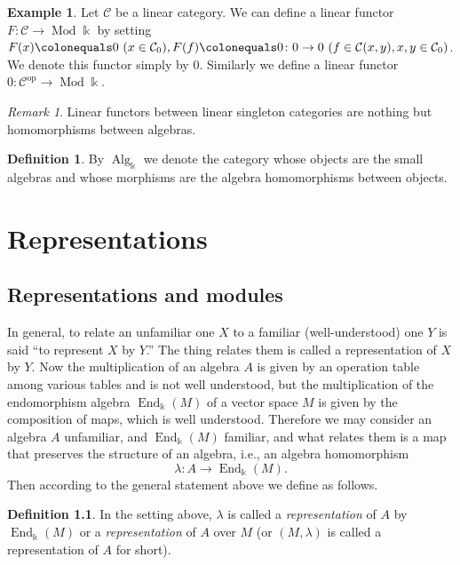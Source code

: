 \documentclass{surv-l}
\numberwithin{equation}{chapter}
\numberwithin{figure}{chapter}
\theoremstyle{plain}
\theoremstyle{definition}
\newtheorem{dfn}[thm]{Definition}
\newtheorem{exm}[thm]{Example}
\theoremstyle{remark}
\newtheorem{rmk}[thm]{Remark}
\DeclareMathOperator{\End}{End}
\DeclareMathOperator{\Mod}{Mod}
\DeclareMathOperator{\Alg}{Alg}
\begin{document}
\begin{exm}\label{exm:zero-fun}
Let ${\mathcal{C}}$ be a linear category.
We can define a linear functor
$F \colon {\mathcal{C}} \to \Mod \Bbbk$ by setting
$F(x)\colonequals  0 \ (x \in {\mathcal{C}}_0), F(f)\colonequals  0 \colon 0 \to 0 \ (f \in {\mathcal{C}}(x, y), x, y \in {\mathcal{C}}_0)$.
We denote this functor simply by $0$.
Similarly we define a linear functor $0 \colon {\mathcal{C}}^{\mathrm{op}} \to \Mod \Bbbk$.
\end{exm}

\begin{rmk}
Linear functors between linear singleton categories
are nothing but homomorphisms between algebras.
\end{rmk}

\begin{dfn}\label{dfn:Alg}
By $\Alg_\Bbbk$ we denote the category whose objects are the small algebras
and whose morphisms are the algebra homomorphisms between objects.
\end{dfn}



\chapter{Representations}\label{ch:rep}\label{ch:2}


\section{Representations and modules}\label{sec:rep-mod}

In general, to relate an unfamiliar one $X$ to a familiar (well-understood) one $Y$
is said ``to represent $X$ by $Y$.''
The thing relates them is called a representation of $X$ by $Y$.
Now the multiplication of an algebra $A$ is given by an operation table among various tables and is not well understood, but the multiplication of the endomorphism algebra $\End_\Bbbk(M)$ of a vector space $M$ is given by the composition of maps,
which is well understood.
Therefore we may consider an algebra $A$ unfamiliar, and $\End_\Bbbk(M)$ familiar,
and what relates them is a map that preserves the structure of
an algebra, i.e., an algebra homomorphism
\[
\lambda \colon A \to \End_\Bbbk(M).
\]
Then according to the general statement above we define as follows.

\begin{dfn}
In the setting above,
$\lambda$ is called a \emph{representation} of $A$ by $\End_\Bbbk(M)$
or a \emph{representation} of $A$ over $M$
(or $(M, \lambda)$ is called a representation of $A$ for short).
\end{dfn}
\end{document}
